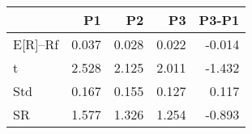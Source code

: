 \begin{tabular}{lrrrr}
\toprule
 & P1 & P2 & P3 & P3-P1 \\
\midrule
E[R]--Rf & 0.037 & 0.028 & 0.022 & -0.014 \\
t & 2.528 & 2.125 & 2.011 & -1.432 \\
Std & 0.167 & 0.155 & 0.127 & 0.117 \\
SR & 1.577 & 1.326 & 1.254 & -0.893 \\
\bottomrule
\end{tabular}
